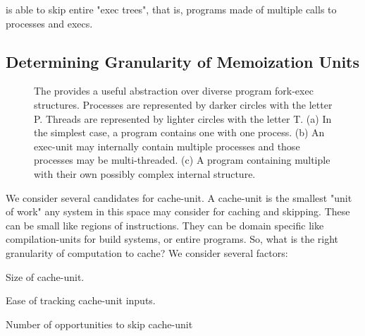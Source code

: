 \pc is able to skip entire "exec trees", that is, programs made of multiple calls to processes and execs.
\subsection{Determining Granularity of Memoization Units}

\begin{figure*}
\centering
{}
\caption{The \cacheunit{} provides a useful abstraction over diverse program fork-exec structures. Processes are represented by darker circles with the letter P. Threads are represented by lighter
circles with the letter T. (a) In the simplest case, a program contains one \cacheunit{} with one process. (b) An exec-unit may internally contain multiple processes and those processes may be multi-threaded. (c) A program containing multiple \cacheunit{} with their own possibly complex internal
structure.}
\label{fig:exec-units}
\end{figure*}

We consider several candidates for cache-unit. A cache-unit is the smallest "unit of work" any system in this space may consider for caching and skipping. These can be small like regions of instructions. They can be domain specific like compilation-units for build systems, or entire programs. So, what is the right granularity of computation to cache? We consider several factors:

\begin{compactitem}
  \item Size of cache-unit.
  \item Ease of tracking cache-unit inputs.
  \item Number of opportunities to skip cache-unit
\end{compactitem}

